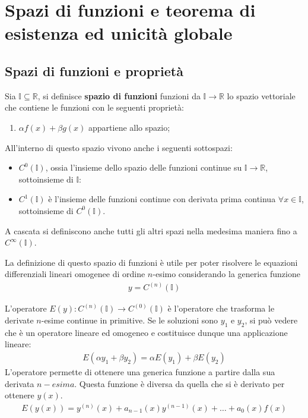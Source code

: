 \documentclass[a4paper, oneside]{book}
\begin{document}
\section{Spazi di funzioni e teorema di esistenza ed unicità globale}
\subsection{Spazi di funzioni e proprietà}
\begin{definition}
    Sia $\mathbb{I} \subseteq \mathbb{R}$, si definisce \textbf{spazio di funzioni}
    funzioni da $\mathbb{I} \to \mathbb{R}$ lo spazio vettoriale che
    contiene le funzioni con le seguenti proprietà:
    \begin{enumerate}
        \item $\alpha f(x)  + \beta g(x) $ appartiene allo spazio;
    \end{enumerate}
    All'interno di questo spazio vivono anche i seguenti sottospazi:
    \begin{itemize}
        \item $C^{0}(\mathbb{I})$, ossia l'insieme dello spazio delle funzioni continue su $\mathbb{I} \to \mathbb{R}$, sottoinsieme di $\mathbb{I}$:
        \item $C^{1}(\mathbb{I})$ è l'insieme delle funzioni continue con derivata prima continua $\forall x \in \mathbb{I}$, sottoinsieme di $C^{0}(\mathbb{I})$.
    \end{itemize}
    A cascata si definiscono anche tutti gli altri spazi nella medesima maniera fino a $C^{\infty }(\mathbb{I})$.
\end{definition} \noindent
La definizione di questo spazio di funzioni è utile per poter risolvere le equazioni
differenziali lineari omogenee di ordine $n$-esimo considerando la generica funzione
\begin{gather*}
    y = C^{(n)}(\mathbb{I}) 
\end{gather*}
\begin{definition}[Operatore $E$]
L'operatore $E(y) : C^{(n)}(\mathbb{I}) \to C^{(0)}(\mathbb{I})  $ è
l'operatore che trasforma le derivate $n$-esime continue in primitive.
Se le soluzioni sono $y_1$ e $y_2$, si può vedere che è un operatore lineare
ed omogeneo e costituisce dunque una applicazione lineare:
\begin{gather*}
    E(\alpha y_1 + \beta y_2) = \alpha E(y_1) + \beta E(y_2)
\end{gather*}
L'operatore permette di ottenere una generica funzione a partire dalla sua 
derivata $n-esima$. Questa funzione è diversa da quella che si è derivato per ottenere $y(x)$.
\begin{align}
    E(y(x)) = y^{(n)}(x) + a_{n - 1}(x)y^{(n - 1)}(x) + \dots + a_0(x) f(x)
\end{align}
\end{definition}
\end{document}
